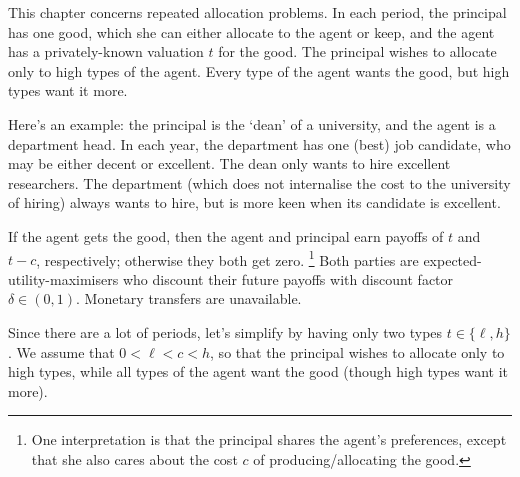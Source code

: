 






This chapter concerns repeated allocation problems.
In each period, the principal has one good, which she can either allocate to the agent or keep,
and the agent has a privately-known valuation $t$ for the good.
The principal wishes to allocate only to high types of the agent.
Every type of the agent wants the good, but high types want it more.

Here's an example: the principal is the `dean' of a university, and the agent is a department head. In each year, the department has one (best) job candidate, who may be either decent or excellent.
The dean only wants to hire excellent researchers.
The department (which does not internalise the cost to the university of hiring) always wants to hire, but is more keen when its candidate is excellent.

If the agent gets the good, then the agent and principal earn payoffs of $t$ and $t-c$, respectively; otherwise they both get zero.%
	\footnote{One interpretation is that the principal shares the agent's preferences, except that she also cares about the cost $c$ of producing/allocating the good.}
Both parties are expected-utility-maximisers who discount their future payoffs with discount factor $\delta \in (0,1)$.
Monetary transfers are unavailable.

Since there are a lot of periods, let's simplify by having only two types $t \in \{\ell,h\}$.
We assume that $0 < \ell < c < h$,
so that the principal wishes to allocate only to high types,
while all types of the agent want the good (though high types want it more).

